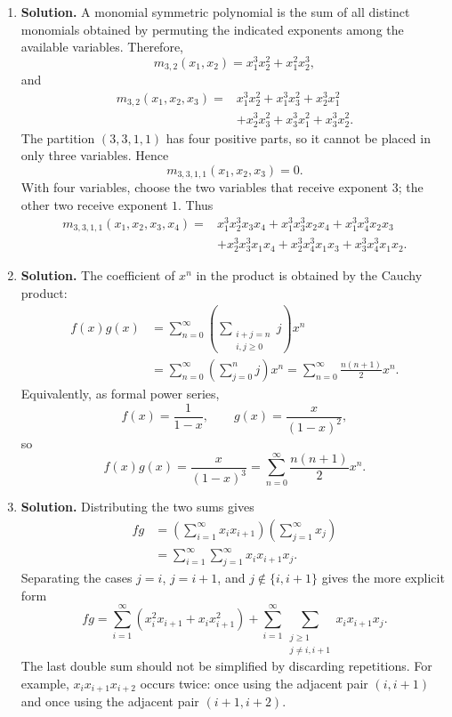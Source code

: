 \documentclass{article}
\begin{document}
\begin{enumerate}
\item \textbf{Solution.}
A monomial symmetric polynomial is the sum of all distinct monomials
obtained by permuting the indicated exponents among the available
variables.  Therefore,
\[
m_{3,2}(x_1,x_2)=x_1^3x_2^2+x_1^2x_2^3,
\]
and
\[
\begin{aligned}
m_{3,2}(x_1,x_2,x_3)
={}&x_1^3x_2^2+x_1^3x_3^2+x_2^3x_1^2\\
 &+x_2^3x_3^2+x_3^3x_1^2+x_3^3x_2^2.
\end{aligned}
\]
The partition $(3,3,1,1)$ has four positive parts, so it cannot be placed
in only three variables.  Hence
\[
m_{3,3,1,1}(x_1,x_2,x_3)=0.
\]
With four variables, choose the two variables that receive exponent $3$;
the other two receive exponent $1$.  Thus
\[
\begin{aligned}
m_{3,3,1,1}(x_1,x_2,x_3,x_4)
={}&x_1^3x_2^3x_3x_4+x_1^3x_3^3x_2x_4
   +x_1^3x_4^3x_2x_3\\
 &+x_2^3x_3^3x_1x_4+x_2^3x_4^3x_1x_3
   +x_3^3x_4^3x_1x_2.
\end{aligned}
\]

\item \textbf{Solution.}
The coefficient of $x^n$ in the product is obtained by the Cauchy product:
\[
\begin{aligned}
f(x)g(x)
 &=\sum_{n=0}^{\infty}
   \left(\sum_{\substack{i+j=n\\i,j\geq 0}}j\right)x^n\\
 &=\sum_{n=0}^{\infty}
   \left(\sum_{j=0}^{n}j\right)x^n
 =\sum_{n=0}^{\infty}\frac{n(n+1)}{2}x^n.
\end{aligned}
\]
Equivalently, as formal power series,
\[
f(x)=\frac{1}{1-x},
\qquad
g(x)=\frac{x}{(1-x)^2},
\]
so
\[
\boxed{f(x)g(x)=\frac{x}{(1-x)^3}
=\sum_{n=0}^{\infty}\frac{n(n+1)}{2}x^n.}
\]

\item \textbf{Solution.}
Distributing the two sums gives
\[
\begin{aligned}
fg
 &=\left(\sum_{i=1}^{\infty}x_ix_{i+1}\right)
   \left(\sum_{j=1}^{\infty}x_j\right)\\
 &=\sum_{i=1}^{\infty}\sum_{j=1}^{\infty}
   x_ix_{i+1}x_j.
\end{aligned}
\]
Separating the cases $j=i$, $j=i+1$, and
$j\notin\{i,i+1\}$ gives the more explicit form
\[
\boxed{
fg=\sum_{i=1}^{\infty}
   \left(x_i^2x_{i+1}+x_ix_{i+1}^2\right)
 +\sum_{i=1}^{\infty}
   \sum_{\substack{j\geq 1\\j\ne i,i+1}}
   x_ix_{i+1}x_j.}
\]
The last double sum should not be simplified by discarding repetitions.
For example, $x_ix_{i+1}x_{i+2}$ occurs twice: once using the adjacent
pair $(i,i+1)$ and once using the adjacent pair $(i+1,i+2)$.


\end{enumerate}
\end{document}
